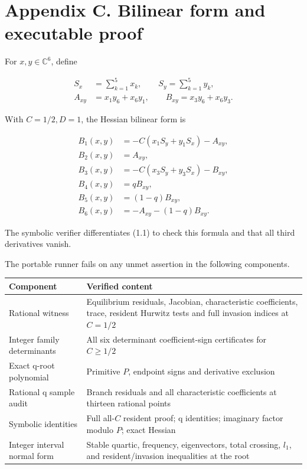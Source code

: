 \documentclass[
  11pt,
]{article}
\newcounter{none} %
\begin{document}
\section{Appendix C. Bilinear form and executable
proof}\label{appendix-c.-bilinear-form-and-executable-proof}

For \(x,y\in\mathbb C^6\), define

\[
\begin{aligned}
S_x&=\sum_{k=1}^5x_k,\qquad S_y=\sum_{k=1}^5y_k,\\
A_{xy}&=x_1y_6+x_6y_1,\qquad B_{xy}=x_3y_6+x_6y_3.
\end{aligned}
\]

With \(C=1/2,D=1\), the Hessian bilinear form is

\[
\begin{aligned}
B_1(x,y)&=-C(x_1S_y+y_1S_x)-A_{xy},\\
B_2(x,y)&=A_{xy},\\
B_3(x,y)&=-C(x_3S_y+y_3S_x)-B_{xy},\\
B_4(x,y)&=qB_{xy},\\
B_5(x,y)&=(1-q)B_{xy},\\
B_6(x,y)&=-A_{xy}-(1-q)B_{xy}.
\end{aligned}
\]

The symbolic verifier differentiates (1.1) to check this formula and
that all third derivatives vanish.

\newpage

The portable runner fails on any unmet assertion in the following
components.

{\def\LTcaptype{none} %
\begin{longtable}[]{@{}
  >{\raggedright\arraybackslash}p{}
  >{\raggedright\arraybackslash}p{}@{}}
\toprule\noalign{}
\begin{minipage}[b]{\linewidth}\raggedright
Component
\end{minipage} & \begin{minipage}[b]{\linewidth}\raggedright
Verified content
\end{minipage} \\
\midrule\noalign{}
\endhead
\bottomrule\noalign{}
\endlastfoot
Rational witness & Equilibrium residuals, Jacobian, characteristic
coefficients, trace, resident Hurwitz tests and full invasion indices at
\(C=1/2\) \\
Integer family determinants & All six determinant coefficient-sign
certificates for \(C\geq1/2\) \\
Exact q-root polynomial & Primitive \(P\), endpoint signs and derivative
exclusion \\
Rational q sample audit & Branch residuals and all characteristic
coefficients at thirteen rational points \\
Symbolic identities & Full all-\(C\) resident proof; q identities;
imaginary factor modulo \(P\); exact Hessian \\
Integer interval normal form & Stable quartic, frequency, eigenvectors,
total crossing, \(l_1\), and resident/invasion inequalities at the
root \\
\end{longtable}
}
\end{document}
